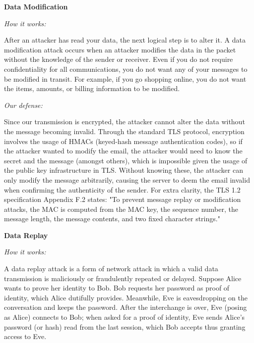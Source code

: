 \documentclass[a4paper,twoside,10pt]{report}
\begin{document}
\vspace{2.5mm}
\noindent
{\large\textbf{Data Modification}}

\vspace{1mm}
\noindent
\textit{How it works: }

After an attacker has read your data, the next logical step is to alter it. A data modification attack occurs when an attacker modifies the data in the packet without the knowledge of the sender or receiver. Even if you do not require confidentiality for all communications, you do not want any of your messages to be modified in transit. For example, if you go shopping online, you do not want the items, amounts, or billing information to be modified.

\vspace{2.5mm}
\noindent
\textit{Our defense: }

Since our transmission is encrypted, the attacker cannot alter the data without the message becoming invalid. Through the standard TLS protocol, encryption involves the usage of HMACs (keyed-hash message authentication codes), so if the attacker wanted to modify the email, the attacker would need to know the secret and the message (amongst others), which is impossible given the usage of the public key infrastructure in TLS. Without knowing these, the attacker can only modify the message arbitrarily, causing the server to deem the email invalid when confirming the authenticity of the sender. For extra clarity, the TLS 1.2 specification Appendix F.2 states: "To prevent message replay or modification attacks, the MAC is computed from the MAC key, the sequence number, the message length, the message contents, and two fixed character strings."

\vspace{2.5mm}
\noindent
{\large\textbf{Data Replay}}

\vspace{1mm}
\noindent
\textit{How it works: }

A data replay attack is a form of network attack in which a valid data transmission is maliciously or fraudulently repeated or delayed. Suppose Alice wants to prove her identity to Bob. Bob requests her password as proof of identity, which Alice dutifully provides. Meanwhile, Eve is eavesdropping on the conversation and keeps the password. After the interchange is over, Eve (posing as Alice) connects to Bob; when asked for a proof of identity, Eve sends Alice's password (or hash) read from the last session, which Bob accepts thus granting access to Eve.
\end{document}
